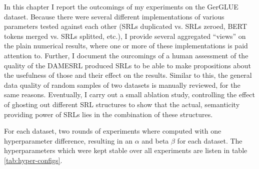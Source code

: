 \label{chap:5_results}


In this chapter I report the outcomings of my experiments on the GerGLUE dataset. Because there
were several different implementations of various parameters tested against each other (SRLs duplicated vs.
SRLs zeroed, BERT tokens merged vs. SRLs splitted, etc.), I provide several aggregated ``views'' on the
plain numerical results, where one or more of these implementations is paid attention to. Further, I
document the ourcomings of a human assessment of the quality of the DAMESRL produced SRLs to be able to
make propositions about the usefulness of those and their effect on the results. Similar to this, the
general data quality of random samples of two datasets is manually reviewed, for the same reasons.
Eventually, I carry out a small ablation study, controlling the effect of ghosting out different
SRL structures to show that the actual, semanticity providing power of SRLs lies in the combination
of these structures.

For each dataset, two
rounds of experiments where computed with one hyperparameter difference, resulting in
an $\alpha$ and beta $\beta$ for each dataset. The hyperparameters which were kept stable
over all experiments are listen in table \ref{tab:hyper-configs}.


